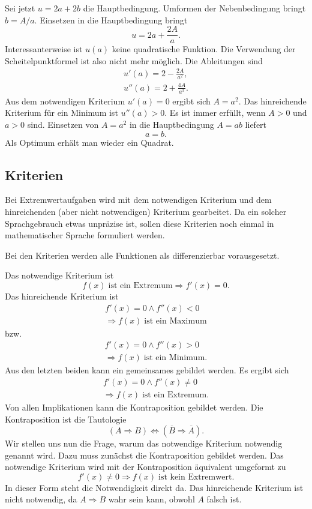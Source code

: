 \documentclass[a4paper,11pt,fleqn,twocolumn,twoside,dvipdfmx]{scrartcl}
\begin{document}
Sei jetzt $u=2a+2b$ die Hauptbedingung. Umformen der Nebenbedingung
bringt $b=A/a$. Einsetzen in die Hauptbedingung bringt
\[u=2a+\frac{2A}{a}.\]
Interessanterweise ist $u(a)$ keine quadratische Funktion.
Die Verwendung der Scheitelpunktformel ist also nicht mehr möglich.
Die Ableitungen sind
\begin{gather*}
u'(a) = 2-\frac{2A}{a^2},\\
u''(a) = 2+\frac{4A}{a^3}.
\end{gather*}
Aus dem notwendigen Kriterium $u'(a)=0$ ergibt sich
$A=a^2$. Das hinreichende Kriterium für ein Minimum ist
$u''(a)>0$. Es ist immer erfüllt, wenn $A>0$ und $a>0$ sind.
Einsetzen von $A=a^2$ in die Hauptbedingung $A=ab$ liefert
\[a=b.\]
Als Optimum erhält man wieder ein Quadrat.


\subsection*{Kriterien}

Bei Extremwertaufgaben wird mit dem notwendigen Kriterium und
dem hinreichenden (aber nicht notwendigen) Kriterium gearbeitet.
Da ein solcher Sprachgebrauch etwas unpräzise ist, sollen diese
Kriterien noch einmal in mathematischer Sprache formuliert werden.

Bei den Kriterien werden alle Funktionen als differenzierbar
vorausgesetzt.

Das notwendige Kriterium ist
\[f(x)\;\text{ist ein Extremum}\Rightarrow f'(x)=0.\]
Das hinreichende Kriterium ist
\begin{gather*}
f'(x)=0\wedge f''(x)<0\\
\Rightarrow f(x)\;\text{ist ein Maximum}
\end{gather*}
bzw.
\begin{gather*}
f'(x)=0\wedge f''(x)>0\\
\Rightarrow f(x)\;\text{ist ein Minimum}.
\end{gather*}
Aus den letzten beiden kann ein gemeinsames gebildet werden.
Es ergibt sich
\begin{gather*}
f'(x)=0\wedge f''(x)\ne 0\\
\Rightarrow f(x)\;\text{ist ein Extremum}.
\end{gather*}
Von allen Implikationen kann die Kontraposition gebildet werden.
Die Kontraposition ist die Tautologie
\[(A\Rightarrow B) \Leftrightarrow
(\overline B\Rightarrow\overline A).\]
Wir stellen uns nun die Frage, warum das notwendige Kriterium
{\glqq}notwendig{\grqq} genannt wird. Dazu muss zunächst die Kontraposition
gebildet werden. Das notwendige Kriterium wird mit der Kontraposition
äquivalent umgeformt zu
\[f'(x)\ne 0\Rightarrow f(x)\;\text{ist kein Extremwert}.\]
In dieser Form steht die Notwendigkeit direkt da.
Das hinreichende Kriterium ist nicht notwendig, da $A\Rightarrow B$
wahr sein kann, obwohl $A$ falsch ist.
\end{document}
